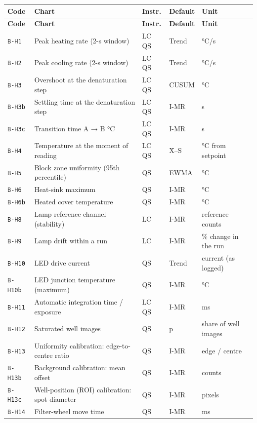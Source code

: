 {\footnotesize
\begin{longtable}{@{}lllll@{}}
\toprule \textbf{Code} & \textbf{Chart} & \textbf{Instr.} & \textbf{Default} & \textbf{Unit} \\\midrule\endfirsthead
\toprule \textbf{Code} & \textbf{Chart} & \textbf{Instr.} & \textbf{Default} & \textbf{Unit} \\\midrule\endhead
\texttt{B-H1} & Peak heating rate (2-s window) & LC QS & Trend & °C/s \\\hline
\texttt{B-H2} & Peak cooling rate (2-s window) & LC QS & Trend & °C/s \\\hline
\texttt{B-H3} & Overshoot at the denaturation step & LC QS & CUSUM & °C \\\hline
\texttt{B-H3b} & Settling time at the denaturation step & LC QS & I-MR & s \\\hline
\texttt{B-H3c} & Transition time A → B °C & LC QS & I-MR & s \\\hline
\texttt{B-H4} & Temperature at the moment of reading & LC QS & X̄–S & °C from setpoint \\\hline
\texttt{B-H5} & Block zone uniformity (95th percentile) & QS & EWMA & °C \\\hline
\texttt{B-H6} & Heat-sink maximum & QS & I-MR & °C \\\hline
\texttt{B-H6b} & Heated cover temperature & QS & I-MR & °C \\\hline
\texttt{B-H8} & Lamp reference channel (stability) & LC & I-MR & reference counts \\\hline
\texttt{B-H9} & Lamp drift within a run & LC & I-MR & \% change in the run \\\hline
\texttt{B-H10} & LED drive current & QS & Trend & current (as logged) \\\hline
\texttt{B-H10b} & LED junction temperature (maximum) & QS & I-MR & °C \\\hline
\texttt{B-H11} & Automatic integration time / exposure & LC QS & I-MR & ms \\\hline
\texttt{B-H12} & Saturated well images & QS & p & share of well images \\\hline
\texttt{B-H13} & Uniformity calibration: edge-to-centre ratio & QS & I-MR & edge / centre \\\hline
\texttt{B-H13b} & Background calibration: mean offset & QS & I-MR & counts \\\hline
\texttt{B-H13c} & Well-position (ROI) calibration: spot diameter & QS & I-MR & pixels \\\hline
\texttt{B-H14} & Filter-wheel move time & QS & I-MR & ms \\\hline

\end{longtable}}
